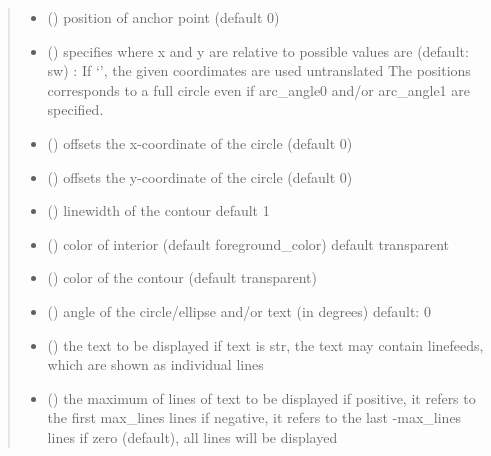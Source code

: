 \documentclass[letterpaper,10pt,english]{sphinxmanual}
\begin{document}
\begin{fulllineitems}
\begin{quote}
\begin{description}
\begin{itemize}
\item {} 
 () \textendash{} position of anchor point (default 0)

\item {} 
 () \textendash{} specifies where x and y are relative to 
possible values are (default: sw) : 
If ‘’, the given coordimates are used untranslated 
The positions corresponds to a full circle even if arc\_angle0 and/or arc\_angle1 are specified.

\item {} 
 () \textendash{} offsets the x-coordinate of the circle (default 0)

\item {} 
 () \textendash{} offsets the y-coordinate of the circle (default 0)

\item {} 
 () \textendash{} linewidth of the contour 
default 1

\item {} 
 () \textendash{} color of interior (default foreground\_color) 
default transparent

\item {} 
 () \textendash{} color of the contour (default transparent)

\item {} 
 () \textendash{} angle of the circle/ellipse and/or text (in degrees) 
default: 0

\item {} 
 (\sphinxstyleliteralemphasis{, }) \textendash{} the text to be displayed 
if text is str, the text may contain linefeeds, which are shown as individual lines

\item {} 
 () \textendash{} the maximum of lines of text to be displayed 
if positive, it refers to the first max\_lines lines 
if negative, it refers to the last -max\_lines lines 
if zero (default), all lines will be displayed


\end{itemize}
\end{description}
\end{quote}
\end{fulllineitems}
\end{document}
